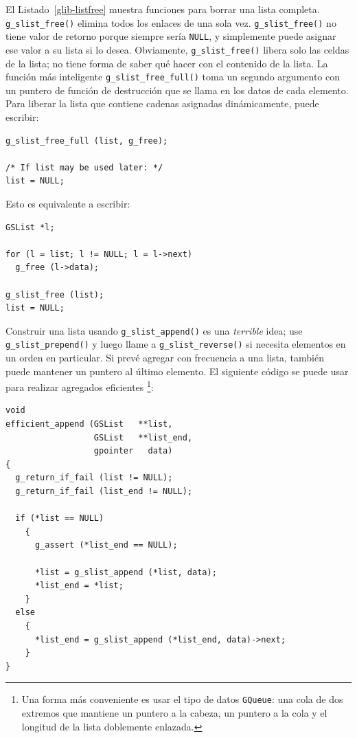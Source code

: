 El Listado~\ref{glib-listfree} muestra funciones para borrar una lista completa. \lstinline{g_slist_free()} elimina todos los enlaces de una sola vez. \lstinline{g_slist_free()} no tiene valor de retorno porque siempre sería \lstinline{NULL}, y simplemente puede asignar ese valor a su lista si lo desea. Obviamente, \lstinline{g_slist_free()} libera solo las celdas de la lista; no tiene forma de saber qué hacer con el contenido de la lista. La función más inteligente \lstinline{g_slist_free_full()} toma un segundo argumento con un puntero de función de destrucción que se llama en los datos de cada elemento. Para liberar la lista que contiene cadenas asignadas dinámicamente, puede escribir:
\begin{lstlisting}
g_slist_free_full (list, g_free);

/* If list may be used later: */
list = NULL;
\end{lstlisting}

Esto es equivalente a escribir:
\begin{lstlisting}
GSList *l;

for (l = list; l != NULL; l = l->next)
  g_free (l->data);

g_slist_free (list);
list = NULL;
\end{lstlisting}

Construir una lista usando \lstinline{g_slist_append()} es una \emph{terrible} idea; use \lstinline{g_slist_prepend()} y luego llame a \lstinline{g_slist_reverse()} si necesita elementos en un orden en particular. Si prevé agregar con frecuencia a una lista, también puede mantener un puntero al último elemento. El siguiente código se puede usar para realizar agregados eficientes \footnote{Una forma más conveniente es usar el tipo de datos \lstinline{GQueue}: una cola de dos extremos que mantiene un puntero a la cabeza, un puntero a la cola y el longitud de la lista doblemente enlazada.}:

\pagebreak[2]
\begin{lstlisting}
void
efficient_append (GSList   **list,
                  GSList   **list_end,
                  gpointer   data)
{
  g_return_if_fail (list != NULL);
  g_return_if_fail (list_end != NULL);

  if (*list == NULL)
    {
      g_assert (*list_end == NULL);

      *list = g_slist_append (*list, data);
      *list_end = *list;
    }
  else
    {
      *list_end = g_slist_append (*list_end, data)->next;
    }
}
\end{lstlisting}

